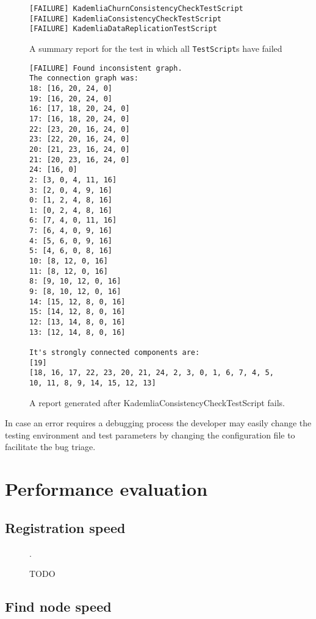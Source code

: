 \begin{figure}[tbp]
\begin{verbatim}
[FAILURE] KademliaChurnConsistencyCheckTestScript
[FAILURE] KademliaConsistencyCheckTestScript
[FAILURE] KademliaDataReplicationTestScript
\end{verbatim}
\caption{A summary report for the test in which all \texttt{TestScript}s have
failed}
\label{fig:sumrep_failure}
\end{figure}

\begin{figure}[tbp]
\begin{verbatim}
[FAILURE] Found inconsistent graph.
The connection graph was:
18: [16, 20, 24, 0]
19: [16, 20, 24, 0]
16: [17, 18, 20, 24, 0]
17: [16, 18, 20, 24, 0]
22: [23, 20, 16, 24, 0]
23: [22, 20, 16, 24, 0]
20: [21, 23, 16, 24, 0]
21: [20, 23, 16, 24, 0]
24: [16, 0]
2: [3, 0, 4, 11, 16]
3: [2, 0, 4, 9, 16]
0: [1, 2, 4, 8, 16]
1: [0, 2, 4, 8, 16]
6: [7, 4, 0, 11, 16]
7: [6, 4, 0, 9, 16]
4: [5, 6, 0, 9, 16]
5: [4, 6, 0, 8, 16]
10: [8, 12, 0, 16]
11: [8, 12, 0, 16]
8: [9, 10, 12, 0, 16]
9: [8, 10, 12, 0, 16]
14: [15, 12, 8, 0, 16]
15: [14, 12, 8, 0, 16]
12: [13, 14, 8, 0, 16]
13: [12, 14, 8, 0, 16]

It's strongly connected components are:
[19]
[18, 16, 17, 22, 23, 20, 21, 24, 2, 3, 0, 1, 6, 7, 4, 5, 10, 11, 8, 9, 14, 15, 12, 13]
\end{verbatim}
\caption{A report generated after KademliaConsistencyCheckTestScript fails.}
\label{fig:conrep}
\end{figure}

In case an error requires a debugging process the developer may easily change
the testing environment and test parameters by changing the configuration file
to facilitate the bug triage.

\section{Performance evaluation}
\label{sec:performance}

\subsection{Registration speed}
\begin{figure}[tbp]
  \centering
\resizebox{\columnwidth}{!}{}
\caption{TODO}
\label{fig:reg_test}.
\end{figure}
\subsection{Find node speed}
